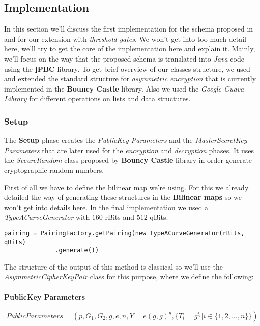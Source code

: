 \documentclass[12pt]{article}
\begin{document}
\subsection{Implementation}

In this section we'll discuss the first implementation for the schema proposed in \cite{fltccd} and for our extension with \textit{threshold gates}. We won't get into too much detail here, we'll try to get the core of the implementation here and explain it. Mainly, we'll focus on the way that the proposed schema is translated into \textit{Java} code using the \textbf{jPBC} library. To get brief overview of our classes structure, we used and extended the standard structure for \textit{asymmetric encryption} that is currently implemented in the \textbf{Bouncy Castle} library. Also we used the \textit{Google Guava Library} for different operations on lists and data structures.

\subsubsection{Setup}

The \textbf{Setup} phase creates the \textit{PublicKey Parameters} and the \textit{MasterSecretKey Parameters} that are later used for the \textit{encryption} and \textit{decryption} phases. It uses the \textit{SecureRandom} class proposed by \textbf{Bouncy Castle} library in order generate cryptographic random numbers.

First of all we have to define the bilinear map we're using. For this we already detailed the way of generating these structures in the \textbf{Bilinear maps} so we won't get into details here. In the final implementation we used a \textit{TypeACurveGenerator} with $160$ rBits and $512$ qBits. 

\begin{lstlisting}
pairing = PairingFactory.getPairing(new TypeACurveGenerator(rBits, qBits)
			  .generate())
\end{lstlisting} 

The structure of the output of this method is classical so we'll use the \textit{AsymmetricCipherKeyPair} class for this purpose, where we define the following:

\paragraph{PublicKey Parameters}

$$PublicParameters = (p, G_1, G_2, g, e, n, Y = e(g, g)^y, \{T_i = g^{t_i} | i \in \{1, 2, ..., n\}\})$$
\end{document}
